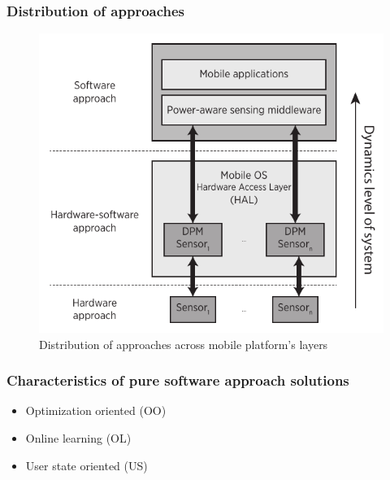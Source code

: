 \documentclass[compress,9pt,xcolor={dvipsnames,table}]{beamer}
\begin{document}
\begin{frame}\frametitle{Distribution of approaches}
\begin{figure}[tb]
  \centering
  \includegraphics[scale=0.72]{../../../resources/images/vectors/approaches-distribution}
  \caption{Distribution of approaches across mobile platform's layers}
  \label{fig:distribution}
\end{figure}
\end{frame}


\begin{frame}[t]\frametitle{Characteristics of pure software approach solutions}
\begin{tcolorbox}[title=Distinctive characteristics of pure software solutions,colframe=PineGreen]
\small
\begin{itemize}
  \item Optimization oriented (OO)
  \item Online learning (OL)
  \item User state oriented (US)
\end{itemize}
\end{tcolorbox}
\end{frame}
\end{document}

